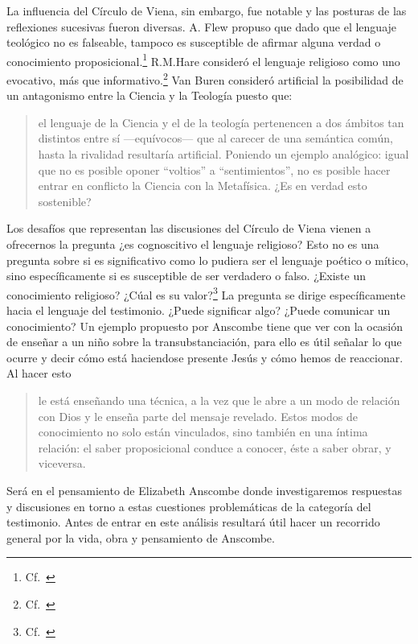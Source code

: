 La influencia del Círculo de Viena, sin embargo, fue notable y las posturas de
las reflexiones sucesivas fueron diversas. A. Flew propuso que dado que el
lenguaje teológico no es falseable, tampoco es susceptible de afirmar alguna
verdad o conocimiento proposicional.\footnote{Cf.~\cite[27--30]{conesa1994cc}}
R.M.Hare consideró el lenguaje religioso como uno evocativo, más que
informativo.\footnote{Cf.~\cite[35--36]{conesa1994cc}} Van Buren consideró
artificial la posibilidad de un antagonismo entre la Ciencia y la Teología
puesto que: \blockquote[{\cite[156]{dominguez2009at}}]{el lenguaje de la Ciencia
  y el de la teología pertenencen a dos ámbitos tan distintos entre sí
  ---equívocos--- que al carecer de una semántica común, hasta la rivalidad
  resultaría artificial. Poniendo un ejemplo analógico: igual que no es posible
  oponer ``voltios'' a ``sentimientos'', no es posible hacer entrar en conflicto
  la Ciencia con la Metafísica. ¿Es en verdad esto sostenible?}

Los desafíos que representan las discusiones del Círculo de Viena vienen a
ofrecernos la pregunta ¿es cognoscitivo el lenguaje religioso? Esto no es una
pregunta sobre si es significativo como lo pudiera ser el lenguaje poético o
mítico, sino específicamente si es susceptible de ser verdadero o falso. ¿Existe
un conocimiento religioso? ¿Cúal es su
valor?\footnote{Cf.~\cite[23]{conesa1994cc}} La pregunta se dirige
específicamente hacia el lenguaje del testimonio. ¿Puede significar algo? ¿Puede
comunicar un conocimiento? Un ejemplo propuesto por Anscombe tiene que ver con
la ocasión de enseñar a un niño sobre la transubstanciación, para ello es útil
señalar lo que ocurre y decir cómo está haciendose presente Jesús y cómo hemos
de reaccionar. Al hacer esto \blockquote[{\cite[21]{conesa1994cc}}]{le está
  enseñando una técnica, a la vez que le abre a un modo de relación con Dios y
  le enseña parte del mensaje revelado. Estos modos de conocimiento no solo
  están vinculados, sino también en una íntima relación: el saber proposicional
  conduce a conocer, éste a saber obrar, y viceversa.}

Será en el pensamiento de Elizabeth Anscombe donde investigaremos respuestas y
discusiones en torno a estas cuestiones problemáticas de la categoría del
testimonio. Antes de entrar en este análisis resultará útil hacer un recorrido
general por la vida, obra y pensamiento de Anscombe.
